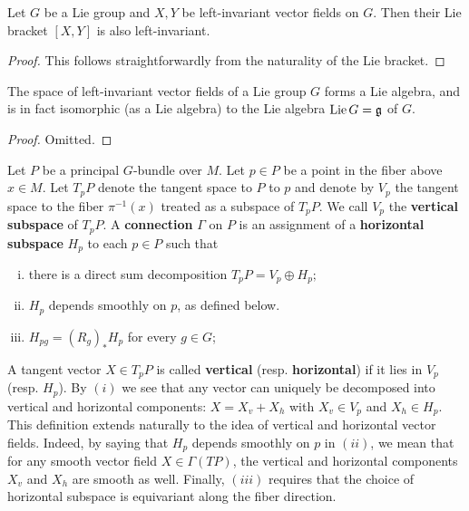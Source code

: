 \begin{lem}
    Let $G$ be a Lie group and $X,Y$ be left-invariant vector fields on $G$. Then their Lie bracket $[X,Y]$ is also left-invariant.
\end{lem}
\begin{proof}
    This follows straightforwardly from the naturality of the Lie bracket.
\end{proof}

\begin{thm}
    The space of left-invariant vector fields of a Lie group $G$ forms a Lie algebra, and is in fact isomorphic (as a Lie algebra) to the Lie algebra
    $\operatorname{Lie} G=\mathfrak g$ of $G$.
\end{thm}
\begin{proof}
    Omitted.
\end{proof}


\begin{defn}
    \label{defn:conn}
    Let $P$ be a principal $G$-bundle over $M$. Let $p\in P$ be a point in the fiber above $x\in M$. Let $T_pP$ denote the tangent space to $P$ to $p$
    and denote by $V_p$ the tangent space to the fiber $\pi^{-1}(x)$ treated as a subspace of $T_pP$. We call $V_p$ the \textbf{vertical subspace} of
    $T_pP$. A \textbf{connection} $\Gamma$ on $P$ is an assignment of a \textbf{horizontal subspace} $H_p$ to each $p\in P$ such that
    \begin{enumerate}[(i)]
        \item there is a direct sum decomposition $T_pP=V_p\oplus H_p;$
        \item $H_p$ depends smoothly on $p$, as defined below.
        \item $H_{pg}=(R_g)_*H_p$ for every $g\in G$;
    \end{enumerate}
    A tangent vector $X\in T_pP$ is called \textbf{vertical} (resp. \textbf{horizontal}) if it lies in $V_p$ (resp. $H_p$). By 
    $(i)$ we see that any vector can uniquely be decomposed into vertical and horizontal components: $X=X_v+X_h$ with
    $X_v\in V_p$ and $X_h\in H_p$. This definition extends naturally to the idea of vertical and horizontal vector fields.
    Indeed, by saying that $H_p$ depends smoothly on $p$ in $(ii)$, we mean that for any smooth vector field $X\in \Gamma(TP)$, the vertical
    and horizontal components $X_v$ and $X_h$ are smooth as well. Finally, $(iii)$ requires that the choice of horizontal subspace is equivariant along the fiber direction.
\end{defn}

